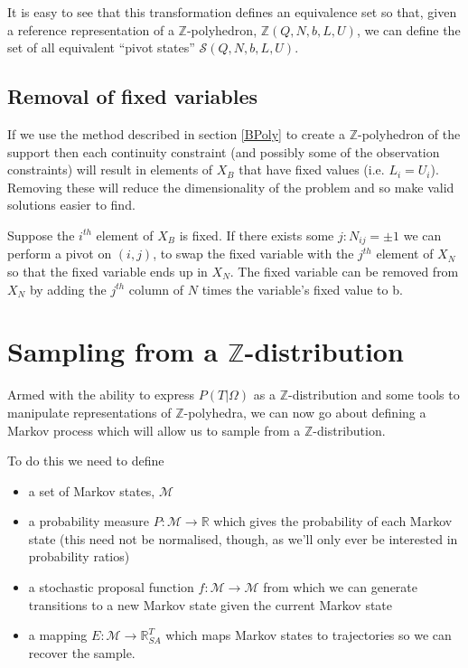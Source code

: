 \documentclass{article}
\begin{document}
It is easy to see that this transformation defines an equivalence set so that, given a reference representation of a $\mathbb{Z}$-polyhedron, $\mathbb{Z}(Q,N,b,L,U)$, we can define the set of all equivalent ``pivot states'' $\mathcal{S}(Q,N,b,L,U)$.

\subsection{Removal of fixed variables}

If we use the method described in section \eqref{BPoly} to create a $\mathbb{Z}$-polyhedron of the support then each continuity constraint (and possibly some of the observation constraints) will result in elements of $X_B$ that have fixed values (i.e. $L_i = U_i$). Removing these will reduce the dimensionality of the problem and so make valid solutions easier to find.

Suppose the $i^{th}$ element of $X_B$ is fixed. If there exists some $j:N_{ij} = \pm 1$ we can perform a pivot on $(i,j)$, to swap the fixed variable with the $j^{th}$ element of $X_N$ so that the fixed variable ends up in $X_N$. The fixed variable can be removed from $X_N$ by adding the $j^{th}$ column of $N$ times the variable's fixed value to b.

\section{Sampling from a $\mathbb{Z}$-distribution}

Armed with the ability to express $P(T|\Omega)$ as a $\mathbb{Z}$-distribution and some tools to manipulate representations of $\mathbb{Z}$-polyhedra, we can now go about defining a Markov process which will allow us to sample from a $\mathbb{Z}$-distribution.

To do this we need to define
\begin{itemize}
\item a set of Markov states, $\mathcal{M}$

\item a probability measure $P: \mathcal{M} \to \mathbb{R}$ which gives the probability of each Markov state (this need not be normalised, though, as we'll only ever be interested in probability ratios)

\item a stochastic proposal function $f:\mathcal{M} \to \mathcal{M}$ from which we can generate transitions to a new Markov state given the current Markov state

\item a mapping $E:\mathcal{M} \to \mathbb{R}^T_{SA}$ which maps Markov states to trajectories so we can recover the sample.
\end{itemize}
\end{document}
